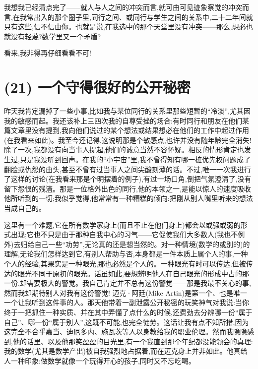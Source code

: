 我想我已经清点完了——就人与人之间的冲突而言,就可由可见迹象察觉的冲突而言,在我常出入的那个圈子里,同行之间、或同行与学生之间的关系中,二十二年间就只有这些,信不信由你。也就是说,在我选中的那个天堂里没有冲突——那么,想必也就没有轻蔑?数学里又一个矛盾?

看来,我非得再仔细看看不可!

\section{(21) 一个守得很好的公开秘密}

昨天我肯定漏掉了一些小事,比如我与某位同行的关系里那些短暂的“冷淡”,尤其因我的敏感而起。我还该补上三四次我的自尊受挫的场合:有时同行和朋友在他们某篇文章里没有提到,我向他们说过的某个想法或结果想必在他们的工作中起过作用(在我看来如此)。我至今还记得,这说明那是个敏感点,也许并没有随年龄完全消失!除了一次,我都没有向当事人提起,他们的诚意当然不容怀疑。相反的情形肯定也发生过,只是我没听到回声。在我的“小宇宙”里,我不曾得知有哪一桩优先权问题成了翻脸或仇怨的由头,甚至不曾有过当事人之间尖酸刻薄的话。不过,唯一一次我进行了这样的讨论(在我看来那是个明摆着的例子),有过一场口角,倒把气氛澄清了,没有留下怨恨的残渣。那是一位格外出色的同行,他的本领之一,是能以惊人的速度吸收他所听到的一切;我似乎觉得,他常常有一种糟糕的倾向:把刚从别人嘴里听来的想法当成自己的。

这里有一个难题,它在所有数学家身上(而且不止在他们身上)都会以或强或弱的形式出现;它也不只是由于那种自我中心的习气——它促使我们大多数人(我也不例外)去归给自己一些“功劳”,无论真的还是想当然的。对一种情境(数学的或别的)的理解,无论我们怎样达到它,有别人帮助与否,本身都是一件本质上属个人的事,一种个人的经验,其果实是一种眼光,那也必然是个人的。一种眼光有时可以传达,但被传达的眼光不同于原初的眼光。话虽如此,要想辨明他人在自己眼光的形成中占的那一份,却需要极大的警觉。我自己肯定并不总有这份警觉——那是我最不关心的事,然而我却期待别人对我有这份警觉!
迈克·阿廷(Mike Artin)是第一个、也是唯一一个让我听到这件事的人。那天他带着一副泄露公开秘密的玩笑神气对我说:当你终于一把抓住一种实质、并在其中弄懂了点什么的时候,还费劲去分辨哪一份“属于自己”、哪一份“属于别人”,这既不可能,也完全徒劳。这话让我有点不知所措,因为这完全不合乎嘉当、迪厄多内、施瓦茨等人以身教给我的职业伦理。然而我隐隐感到,他的话里、以及他那笑盈盈的目光里,有一个我直到那个年纪都没能领会的真理:我的数学(尤其是数学产出)被自我强烈地占据着,而在迈克身上并非如此。他真给人一种印象:做数学就像一个玩得开心的孩子,同时又不忘吃喝。

